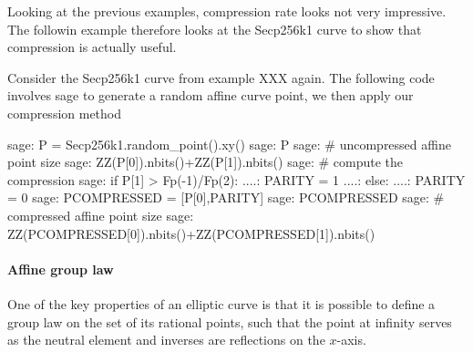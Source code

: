 Looking at the previous examples, compression rate looks not very impressive. The followin example therefore looks at the Secp256k1 curve to show that compression is actually useful.
\begin{example}
Consider the Secp256k1 curve from example XXX again. The following code involves sage to generate a random affine curve point, we then apply our compression method   
\begin{sagecommandline}
sage: P = Secp256k1.random_point().xy()
sage: P
sage: # uncompressed affine point size
sage: ZZ(P[0]).nbits()+ZZ(P[1]).nbits()
sage: # compute the compression
sage: if P[1] > Fp(-1)/Fp(2):
....:     PARITY = 1
....: else:
....:     PARITY = 0
sage: PCOMPRESSED = [P[0],PARITY]
sage: PCOMPRESSED
sage: # compressed affine point size
sage: ZZ(PCOMPRESSED[0]).nbits()+ZZ(PCOMPRESSED[1]).nbits()
\end{sagecommandline}
\end{example}
\paragraph{Affine group law}
One of the key properties of an elliptic curve is that it is possible to define a group law on the set of its rational points, such that the point at infinity serves as the neutral element and inverses are reflections on the $x$-axis.

